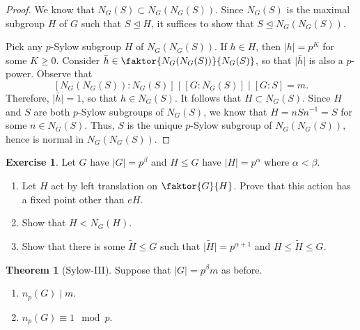 \documentclass[10pt,letterpaper,cm]{nupset}
\theoremstyle{definition}
\theoremstyle{theorem}
\newtheorem{theorem}[definition]{Theorem}
\newtheorem{exercise}[definition]{Exercise}
\theoremstyle{remark}
\newcommand{\1}{\mathbf{1}}
\newcommand{\0}{\vec 0}
\begin{document}
\begin{proof}
We know that $N_G(S) \subset N_G(N_G(S))$. Since $N_G(S)$ is the maximal subgroup $H$ of $G$ such that $S\unlhd H$, it suffices to show that $S\unlhd N_G(N_G(S))$.

Pick any $p$-Sylow subgroup $H$ of $N_G(N_G(S))$. If $h\in H$, then $\lvert{h}\rvert =p^K$ for some $K\geq 0$. Consider $\bar{h} \in \faktor{N_G(N_G(S))}{N_G(S)}$, so that $\lvert{\bar{h}}\rvert$ is also a $p$-power. Observe that $$\left[N_G(N_G(S)): N_G(S)\right]\mid \left[G: N_G(S)\right] \mid \left[G:S\right]=m.$$ Therefore, $\lvert{\bar{h}}\rvert =1$, so that $h \in N_G(S)$. It follows that $H \subset N_G(S)$. Since $H$ and $S$ are both $p$-Sylow subgroups of $N_G(S)$, we know that $H = nSn^{-1} = S$ for some $n\in N_G(S)$. Thus, $S$ is the unique $p$-Sylow subgroup of $N_G(N_G(S))$, hence is normal in $N_G(N_G(S))$.
\end{proof}

\begin{exercise} Let $G$ have $\lvert{G}\rvert=p^{\beta}$ and $H\leq G$ have $\lvert{H}\rvert=p^{\alpha}$ where $\alpha < \beta$. 
\begin{enumerate}
\item Let $H$ act by left translation on $\faktor{G}{H}$. Prove that this action has a fixed point other than $eH$.
\item Show that $H < N_G(H)$.
\item Show that there is some $\tilde{H} \leq G$ such that $\lvert{\tilde{H}}\rvert =p^{\alpha+1}$ and $H \leq \tilde{H} \leq G$.
\end{enumerate}
\end{exercise}

\smallskip

\begin{theorem}[Sylow-III]
Suppose that $\lvert{G}\rvert= p^{\beta}m$ as before.
\begin{enumerate}[label=(\arabic*)]
\item $n_p(G) \mid m$.
\item $n_p(G) \equiv 1 \mod p$.
\end{enumerate}
\end{theorem}
\end{document}

